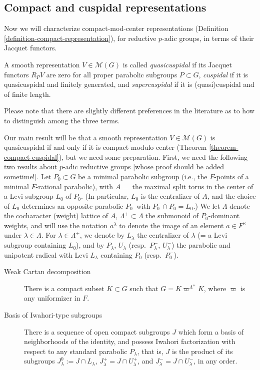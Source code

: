 \subsection{Compact and cuspidal representations}
\label{subsection-compact-cuspidal}

Now we will characterize compact-mod-center representations (Definition \ref{definition-compact-representation}), for reductive $p$-adic groups, in terms of their Jacquet functors.


\begin{definition}
	\label{definition-cuspidal}
A smooth representation $V\in \mathcal M(G)$ is called {\it quasicuspidal} if its Jacquet functors $R_P V$ are zero for all proper parabolic subgroups $P\subset G$, {\it cuspidal} if it is quasicuspidal and finitely generated, and {\it supercuspidal} if it is (quasi)cuspidal and of finite length.
\end{definition}

Please note that there are slightly different preferences in the literature as to how to distinguish among the three terms.

Our main result will be that a smooth representation $V\in \mathcal M(G)$ is quasicuspidal if and only if it is compact modulo center (Theorem \ref{theorem-compact-cuspidal}), but we need some preparation. First, we need the following two results about $p$-adic reductive groups [whose proof should be added sometime!]. Let $P_0\subset G$ be a minimal parabolic subgroup (i.e., the $F$-points of a minimal $F$-rational parabolic), with $A=$ the maximal split torus in the center of a Levi subgroup $L_0$ of $P_0$. (In particular, $L_0$ is the centralizer of $A$, and the choice of $L_0$ determines an opposite parabolic $P_0^-$ with $P_0^-\cap P_0=L_0$.) We let $\Lambda$ denote the cocharacter (weight) lattice of $A$, $\Lambda^+\subset \Lambda$ the submonoid of $P_0$-dominant weights, and will use the notation $a^\lambda$ to denote the image of an element $a\in F^\times$ under $\lambda\in \Lambda$. For $\lambda\in \Lambda^+$, we denote by $L_\lambda$ the centralizer of $\lambda$ (= a Levi subgroup containing $L_0$), and by $P_\lambda$, $U_\lambda$ (resp.\ $P_\lambda^-$, $U_\lambda^-$) the parabolic and unipotent radical with Levi $L_\lambda$ containing $P_0$ (resp.\ $P_0^-$).

\begin{description}
	\item[Weak Cartan decomposition] There is a compact subset $K\subset G$ such that $G = K \varpi^{\Lambda^+} K$, where $\varpi$ is any uniformizer in $F$.
	\item[Basis of Iwahori-type subgroups] There is a sequence of open compact subgroups $J$ which form a basis of neighborhoods of the identity, and possess Iwahori factorization with respect to any standard parabolic $P_\lambda$, that is, $J$ is the product of its subgroups $J_\lambda^0:=J\cap L_\lambda$, $J_\lambda^+=J\cap U_\lambda^+$, and $J_\lambda^-=J\cap U_\lambda^-$, in any order. 
\end{description}



